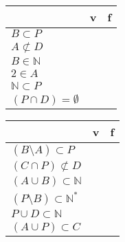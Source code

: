 \begin{minipage}{\linewidth}
\begin{multicols}{2}
	\begin{tabular}{|l|c|c|}
		\hline
		& v & f  \\
		\hline
		$B\subset P$          & \solonly{\checkmark }    &    \\
		\hline
		$A\not\subset D$      & \solonly{\checkmark }    &    \\
		\hline
		$B\in\mathbb{N}$      &   &  \solonly{\checkmark }    \\
		\hline
		$2\in A$              &   &  \solonly{\checkmark }    \\
		\hline
		$\mathbb{N}\subset P$ &   &  \solonly{\checkmark }    \\
		\hline
		$(P\cap D)=\emptyset$      & \solonly{\checkmark }    &    \\
		\hline
	\end{tabular}
	
	\begin{tabular}{|l|c|c|}
		\hline
		& v & f \\ \hline
		
		$(B\setminus A)\subset P$           &  \solonly{\checkmark } &   \\ \hline
		
		$(C\cap P)\not\subset D$            &   & \solonly{\checkmark }  \\ \hline
		
		$(A\cup B)\subset\mathbb{N}$        &   &  \solonly{\checkmark } \\ \hline
		
		$(P\setminus B)\subset\mathbb{N}^*$ & \solonly{\checkmark }  &   \\ \hline
		
		$P\cup D\subset\mathbb{N}$          & \solonly{\checkmark }  &   \\ \hline
		
		$(A\cup P)\subset C$                &   &   \solonly{\checkmark }\\ \hline
	\end{tabular}
	
\end{multicols}
\end{minipage}


